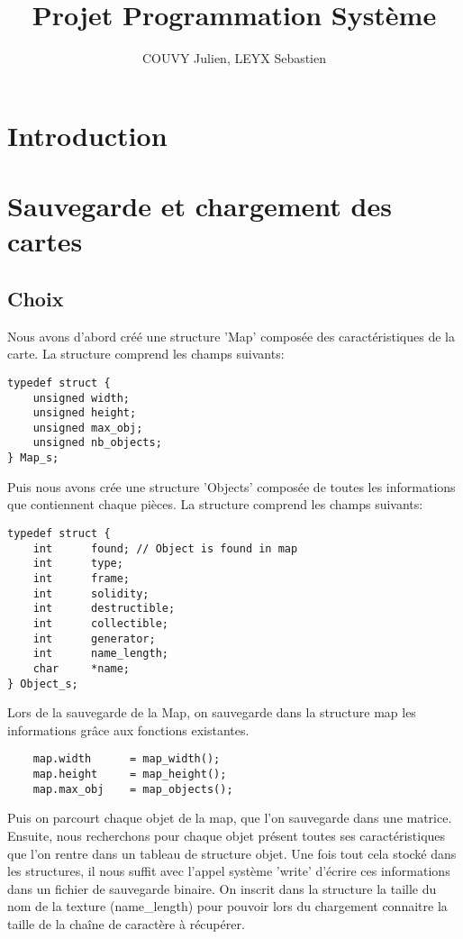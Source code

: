 \documentclass[a4paper]{article}
\title{Projet Programmation Système}
\author{COUVY Julien, LEYX Sebastien}
\begin{document}
\maketitle

\section{Introduction}


\section{Sauvegarde et chargement des cartes}
\subsection{Choix}
Nous avons d'abord créé une structure 'Map' composée des caractéristiques de la carte. La structure comprend les champs suivants:

\begin{verbatim}
typedef struct {
    unsigned width;
    unsigned height;
    unsigned max_obj;
    unsigned nb_objects;
} Map_s;
\end{verbatim}

Puis nous avons crée une structure 'Objects' composée de toutes les informations que contiennent chaque pièces. La structure comprend les champs suivants:
\begin{verbatim}
typedef struct {
    int      found; // Object is found in map
    int      type;
    int      frame;
    int      solidity;
    int      destructible;
    int      collectible;
    int      generator;
    int      name_length;
    char     *name;
} Object_s;
\end{verbatim}

Lors de la sauvegarde de la Map, on sauvegarde dans la structure map les informations grâce aux fonctions existantes.

\begin{verbatim}
    map.width      = map_width();
    map.height     = map_height();
    map.max_obj    = map_objects();
\end{verbatim}   

Puis on parcourt chaque objet de la map, que l'on sauvegarde dans une matrice. Ensuite, nous recherchons pour chaque objet présent toutes ses caractéristiques que l'on rentre dans un tableau de structure objet. Une fois tout cela stocké dans les structures, il nous suffit avec l'appel système 'write' d'écrire ces informations dans un fichier de sauvegarde binaire. On inscrit dans la structure la taille du nom de la texture (name\_length) pour pouvoir lors du chargement connaitre la taille de la chaîne de caractère à récupérer.
\end{document}
